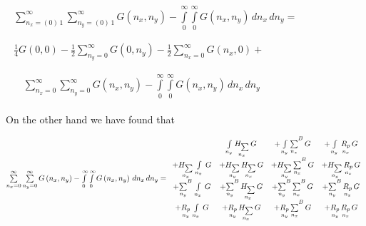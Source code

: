 \documentclass[twoside, 10pt]{article}
\begin{document}
\begin{multicols}{2}
\noindent
$\begin{array}{l}
\begin{array}{ll}
\sum\limits_{n_x=\left(0\right)\,1}^{\infty} \sum\limits_{n_y=\left(0\right)\,1}^{\infty} G\left(n_x, n_y\right) - \int\limits_{0}^{\infty} \int\limits_{0}^{\infty} G\left(n_x, n_y\right)\,d{n_x}\,d{n_y} = & \, \\
\end{array} \\
\begin{array}{c}
\frac{1}{4}G\left(0, 0\right) -\frac{1}{2}\sum\limits_{n_y=0}^{\infty}{G\left(0, n_y\right)} -\frac{1}{2}\sum\limits_{n_x=0}^{\infty}{G\left(n_x, 0\right)} + \\
\end{array} \\
\begin{array}{rr}
\, & \sum\limits_{n_x=0}^{\infty}\sum\limits_{n_y=0}^{\infty}{G\left(n_x, n_y\right)} - \int\limits_{0}^{\infty} \int\limits_{0}^{\infty} G\left(n_x, n_y\right)\,d{n_x}\,d{n_y}
\end{array}
\end{array}$

    On the other hand we have found that

\noindent
\(\sum\limits_{n_x=0}^{\infty} \sum\limits_{n_y=0}^{\infty} G\left(n_x, n_y\right) -\int\limits_{0}^{\infty} \int\limits_{0}^{\infty} G\left(n_x, n_y\right)\,d{n_x}\,d{n_y} = \\
 \begin{array}{cccc}  \, &  \int\limits_{n_y}^{} \underset{n_x}{H_{\sum}}\,G &  + \int\limits_{n_y}^{}{\sum\limits_{n_x}^{}}^{B}\,G &  + \int\limits_{n_y}^{}\,\underset{n_x}{R_{p}}\,G \\
  +\underset{n_y}{H_{\sum}}\,\int\limits_{n_x}^{}\,G &  + \underset{n_y}{H_{\sum}}\,\underset{n_x}{H_{\sum}}\,G &  + \underset{n_y}{H_{\sum}}\,{\sum\limits_{n_x}^{}}^{B}\,G &  + \underset{n_y}{H_{\sum}}\,\underset{n_x}{R_{p}}\,G \\
  + {\sum\limits_{n_y}^{}}^{B}\,\int\limits_{n_x}^{}\,G &  + {\sum\limits_{n_y}^{}}^{B}\,\underset{n_x}{H_{\sum}}\,G &  + {\sum\limits_{n_y}^{}}^{B}\,{\sum\limits_{n_x}^{}}^{B}\,G &  + {\sum\limits_{n_y}^{}}^{B}\,\underset{n_x}{R_{p}}\,G \\
  + \underset{n_y}{R_{p}}\,\int\limits_{n_x}^{}\,G &  + \underset{n_y}{R_{p}}\,\underset{n_x}{H_{\sum}}\,G &  + \underset{n_y}{R_{p}}\,{\sum\limits_{n_x}^{}}^{B}\,G &  + \underset{n_y}{R_{p}}\,\underset{n_x}{R_{p}}\,G \end{array}\)


\end{multicols}
\end{document}
